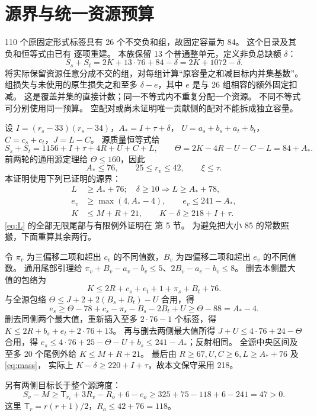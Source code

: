 \documentclass[11pt,a4paper]{article}
\newcommand{\A}{A_*}
\newcommand{\T}{\mathsf T}
\begin{document}
\section{源界与统一资源预算}
110 个原固定形式标签具有 26 个不交负和组，故固定容量为 84。
这个目录及其负和恒等式由已有  逐项重建。
本族保留 13 个普通整单元，定义非负总缺额 $\delta$：
\begin{equation}\label{eq:mass}
S_s+S_t=2K+13\cdot76+84-\delta=2K+1072-\delta.
\end{equation}
将实际保留资源任意分成不交的组，对每组计算“原容量之和减目标内并集基数”。
组损失与未使用的原生损失之和至多 $\delta-e$，其中 $e$ 是与 26 组相容的额外固定扣减。
这是覆盖并集的直接计数；同一不等式内不重复分配一个资源。
不同不等式可分别使用同一预算。
空配对或尚未证明唯一贡献侧的配对不能拆成独立容量。

设 $I=(r_s-33)(r_s-34)$，$\A=I+\tau+\delta$，
$U=a_s+b_s+a_t+b_t$，$C=c_s+c_t$，$J=L-C$。
源质量恒等式给
\[
S_s+S_t=1156+I+\tau+4R+U+C+L,\qquad
\Theta=2K-4R-U-C-L=84+\A.
\]
前两轮的通用源定理给 $\Theta\le160$，因此
\begin{equation}\label{eq:cap}
\A\le76,\qquad25\le r_v\le42,\qquad \xi\le\tau.
\end{equation}
本证明使用下列已证明的源界：
\begin{align}
L&\ge\A+76;\quad \delta\ge10\Longrightarrow L\ge\A+78,\label{eq:L}\\
e_v&\ge\max(4,\A-4),\qquad e_v\le241-\A,\label{eq:ev}\\
K&\le M+R+21,\qquad K-\delta\ge218+I+\tau.\label{eq:K}
\end{align}
\eqref{eq:L} 的全部无限尾部与有限例外证明在
 第 5 节。
为避免把大小 85 的常数照搬，下面重算其余两行。

令 $\pi_v$ 为三偏移二项和超出 $c_v$ 的不同值数，$B_v$ 为四偏移二项和超出 $e_v$ 的不同值数。
通用尾部引理给
$\pi_v+B_v-a_v-b_v\le5$、$2B_v-a_v-b_v\le8$。
删去本侧最大值的包络为
\[K\le2R+c_s+e_t+1+\pi_s+B_t+76.\]
与全源包络 $\Theta\le J+2+2(B_s+B_t)-U$ 合用，得
\[
e_s\ge\Theta-78+c_s-\pi_s-B_s-2B_t+U
\ge\Theta-88=\A-4.
\]
删去同侧两个最大值，重新插入至多 $2\cdot76-1$ 个标签，得
$K\le2R+b_s+e_t+2\cdot76+13$。
再与删去两侧最大值所得 $J+U\le4\cdot76+24-\Theta$ 合用，得
$e_s\le4\cdot76+25-\Theta-U+b_s\le241-\A$；反射相同。
全源中央区间及至多 20 个尾例外给 $K\le M+R+21$。
最后由 $R\ge67,U,C\ge6,L\ge\A+76$ 及 \eqref{eq:mass}，
实际上 $K-\delta\ge220+I+\tau$，故本文保守采用 218。

另有两侧目标长于整个源跨度：
\[
S_v-M\ge\T_{r_v}+3R_v-R_o+6-e_o
\ge325+75-118+6-241=47>0.
\]
这里 $\T_r=r(r+1)/2$，$R_o\le42+76=118$。
\end{document}
